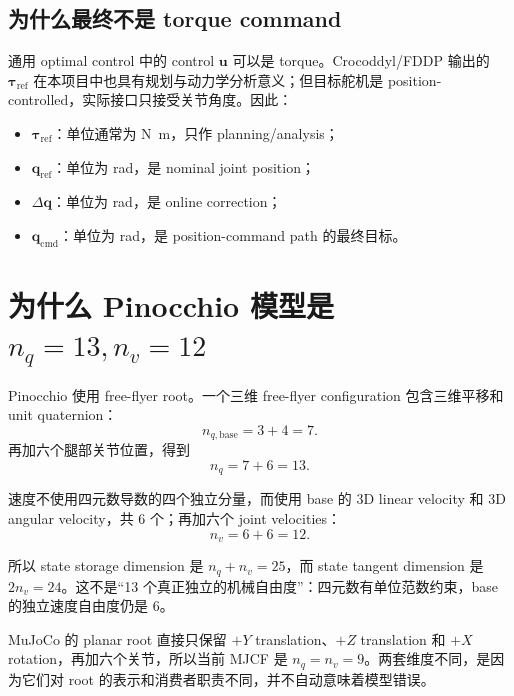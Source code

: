\documentclass[UTF8,11pt,a4paper]{ctexart}
\begin{document}
\subsection{为什么最终不是 torque command}

通用 optimal control 中的 control $\bm u$ 可以是 torque。Crocoddyl/FDDP 输出的 $\bm\tau_{\mathrm{ref}}$ 在本项目中也具有规划与动力学分析意义；但目标舵机是 position-controlled，实际接口只接受关节角度。因此：

\begin{itemize}
  \item $\bm\tau_{\mathrm{ref}}$：单位通常为 \si{\newton\metre}，只作 planning/analysis；
  \item $\bm q_{\mathrm{ref}}$：单位为 rad，是 nominal joint position；
  \item $\Delta\bm q$：单位为 rad，是 online correction；
  \item $\bm q_{\mathrm{cmd}}$：单位为 rad，是 position-command path 的最终目标。
\end{itemize}

\section{为什么 Pinocchio 模型是 \texorpdfstring{$n_q=13,n_v=12$}{nq=13,nv=12}}\label{sec:nqnv}

Pinocchio 使用 free-flyer root。一个三维 free-flyer configuration 包含三维平移和 unit quaternion：
\begin{equation}
  n_{q,\mathrm{base}}=3+4=7.
\end{equation}
再加六个腿部关节位置，得到
\begin{equation}
  n_q=7+6=13.
\end{equation}

速度不使用四元数导数的四个独立分量，而使用 base 的 3D linear velocity 和 3D angular velocity，共 6 个；再加六个 joint velocities：
\begin{equation}
  n_v=6+6=12.
\end{equation}

所以 state storage dimension 是 $n_q+n_v=25$，而 state tangent dimension 是 $2n_v=24$。这不是“13 个真正独立的机械自由度”：四元数有单位范数约束，base 的独立速度自由度仍是 6。

MuJoCo 的 planar root 直接只保留 $+Y$ translation、$+Z$ translation 和 $+X$ rotation，再加六个关节，所以当前 MJCF 是 $n_q=n_v=9$。两套维度不同，是因为它们对 root 的表示和消费者职责不同，并不自动意味着模型错误。
\end{document}
